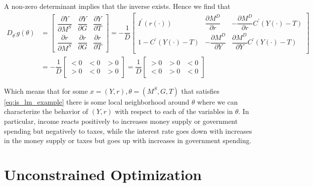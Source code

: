 \documentclass{article}
\theoremstyle{mythm}
\theoremstyle{mydef}
\begin{document}
A non-zero determinant implies that the inverse exists. Hence we find that
\begin{align*}
  D_{\theta^\prime} g(\theta)
  & =
  \left[\begin{matrix}
      \dfrac{\partial Y}{\partial M^S}
    & \dfrac{\partial Y}{\partial G}
    & \dfrac{\partial Y}{\partial T} \\[6pt]
      \dfrac{\partial r}{\partial M^S}
    & \dfrac{\partial r}{\partial G}
    & \dfrac{\partial r}{\partial T}
  \end{matrix}\right]
  =
  - \dfrac{1}{D}
  \left[\begin{matrix}
        I^\prime(r(\cdot))
    &   \dfrac{\partial M^D}{\partial r}
    & - \dfrac{\partial M^D}{\partial r} C^\prime(Y(\cdot) - T)
    \\[6pt]
        1 - C^\prime(Y(\cdot) - T)
    & - \dfrac{\partial M^D}{\partial Y}
    &   \dfrac{\partial M^D}{\partial Y} C^\prime(Y(\cdot) - T)
    \\[6pt]
  \end{matrix}\right] \\
  & =
  - \dfrac{1}{D}
  \left[\begin{matrix}
      < 0
    & < 0
    & > 0 \\[6pt]
      > 0
    & < 0
    & > 0
  \end{matrix}\right]
  =
  \dfrac{1}{D}
  \left[\begin{matrix}
      > 0
    & > 0
    & < 0 \\[6pt]
      < 0
    & > 0
    & < 0
  \end{matrix}\right]
\end{align*}

Which means that for some $x = (Y, r), \theta = (M^S, G, T)$ that satisfies \eqref{eq:is_lm_example} there is some local neighborhood around $\theta$ where we can characterize the behavior of $(Y, r)$ with respect to each of the variables in $\theta$. In particular, income reacts positively to increases money supply or government spending but negatively to taxes, while the interest rate goes down with increases in the money supply or taxes but goes up with increases in government spending.

\section{Unconstrained Optimization}
\label{sub:unconstrained_optimization}


\newpage
\printindex
\end{document}
